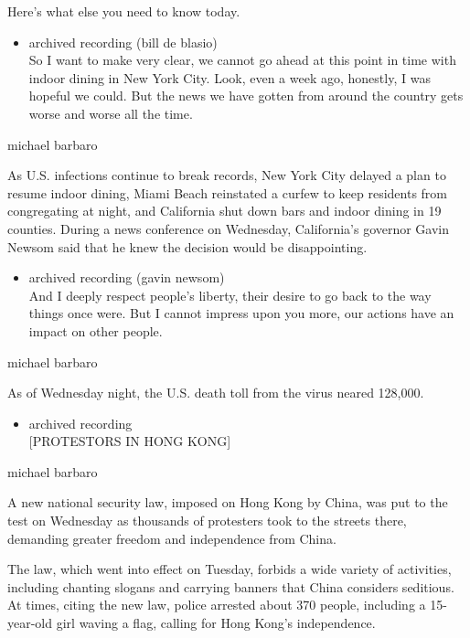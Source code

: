 Here's what else you need to know today.

\begin{itemize}
\tightlist
\item
  archived recording (bill de blasio)\\
  So I want to make very clear, we cannot go ahead at this point in time
  with indoor dining in New York City. Look, even a week ago, honestly,
  I was hopeful we could. But the news we have gotten from around the
  country gets worse and worse all the time.
\end{itemize}

michael barbaro

As U.S. infections continue to break records, New York City delayed a
plan to resume indoor dining, Miami Beach reinstated a curfew to keep
residents from congregating at night, and California shut down bars and
indoor dining in 19 counties. During a news conference on Wednesday,
California's governor Gavin Newsom said that he knew the decision would
be disappointing.

\begin{itemize}
\tightlist
\item
  archived recording (gavin newsom)\\
  And I deeply respect people's liberty, their desire to go back to the
  way things once were. But I cannot impress upon you more, our actions
  have an impact on other people.
\end{itemize}

michael barbaro

As of Wednesday night, the U.S. death toll from the virus neared
128,000.

\begin{itemize}
\tightlist
\item
  archived recording\\
  {[}PROTESTORS IN HONG KONG{]}
\end{itemize}

michael barbaro

A new national security law, imposed on Hong Kong by China, was put to
the test on Wednesday as thousands of protesters took to the streets
there, demanding greater freedom and independence from China.

The law, which went into effect on Tuesday, forbids a wide variety of
activities, including chanting slogans and carrying banners that China
considers seditious. At times, citing the new law, police arrested about
370 people, including a 15-year-old girl waving a flag, calling for Hong
Kong's independence.

